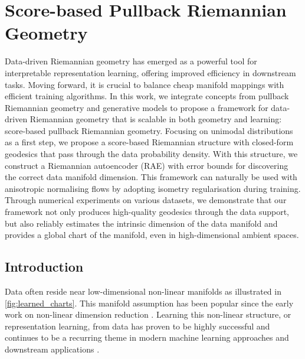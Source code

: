 
\chapter{Score-based Pullback Riemannian Geometry}\label{Chapter:Pullback-riemannian-geometry}

\ifpdf
    \graphicspath{{Chapter5/Figs/Raster/}{Chapter5/Figs/PDF/}{Chapter5/Figs/}}
\else
    \graphicspath{{Chapter5/Figs/Vector/}{Chapter5/Figs/}}
\fi

Data-driven Riemannian geometry has emerged as a powerful tool for interpretable representation learning, offering improved efficiency in downstream tasks. Moving forward, it is crucial to balance cheap manifold mappings with efficient training algorithms. In this work, we integrate concepts from pullback Riemannian geometry and generative models to propose a framework for data-driven Riemannian geometry that is scalable in both geometry and learning: score-based pullback Riemannian geometry. Focusing on unimodal distributions as a first step, we propose a score-based Riemannian structure with closed-form geodesics that pass through the data probability density. With this structure, we construct a Riemannian autoencoder (RAE) with error bounds for discovering the correct data manifold dimension. This framework can naturally be used with anisotropic normalising flows by adopting isometry regularisation during training. Through numerical experiments on various datasets, we demonstrate that our framework not only produces high-quality geodesics through the data support, but also reliably estimates the intrinsic dimension of the data manifold and provides a global chart of the manifold, even in high-dimensional ambient spaces.

\section{Introduction}

Data often reside near low-dimensional non-linear manifolds as illustrated in \ref{fig:learned_charts}. This manifold assumption \cite{fefferman2016testing} has been popular since the early work on non-linear dimension reduction \cite{belkin2001laplacian,coifman2006diffusion,roweis2000nonlinear,sammon1969nonlinear,tenenbaum2000global}. Learning this non-linear structure, or representation learning, from data has proven to be highly successful \cite{demers1992non,kingma2013auto} and continues to be a recurring theme in modern machine learning approaches and downstream applications \cite{chow2022predicting,gomari2022variational,ternes2022multi,vahdat2020nvae,zhong2021cryodrgn}. 

